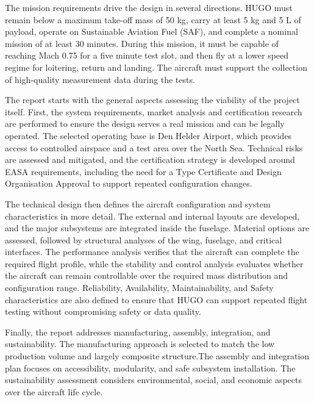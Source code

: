 The mission requirements drive the design in several directions. HUGO must remain below a maximum take-off mass of 50 kg, carry at least 5 kg and 5 L of payload, operate on Sustainable Aviation Fuel (SAF), and complete a nominal mission of at least 30 minutes. During this mission, it must be capable of reaching Mach 0.75 for a five minute test slot, and then fly at a lower speed regime for loitering, return and landing. The aircraft must support the collection of high-quality measurement data during the tests.

The report starts with the general aspects assessing the viability of the project itself. First, the system requirements, market analysis and certification research are performed to ensure the design serves a real mission and can be legally operated. The selected operating base is Den Helder Airport, which provides access to controlled airspace and a test area over the North Sea. Technical risks are assessed and mitigated, and the certification strategy is developed around EASA requirements, including the need for a Type Certificate and Design Organisation Approval to support repeated configuration changes.

The technical design then defines the aircraft configuration and system characteristics in more detail. The external and internal layouts are developed, and the major subsystems are integrated inside the fuselage. Material options are assessed, followed by structural analyses of the wing, fuselage, and critical interfaces. The performance analysis verifies that the aircraft can complete the required flight profile, while the stability and control analysis evaluates whether the aircraft can remain controllable over the required mass distribution and configuration range. Reliability, Availability, Maintainability, and Safety characteristics are also defined to ensure that HUGO can support repeated flight testing without compromising safety or data quality.

Finally, the report addresses manufacturing, assembly, integration, and sustainability. The manufacturing approach is selected to match the low production volume and largely composite structure.The assembly and integration plan focuses on accessibility, modularity, and safe subsystem installation. The sustainability assessment considers environmental, social, and economic aspects over the aircraft life cycle.
